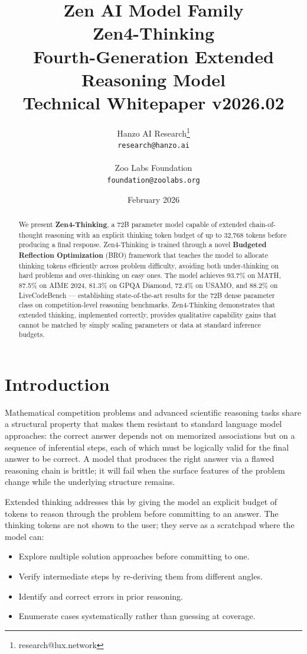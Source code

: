 \documentclass[11pt,a4paper]{article}
\title{
    \vspace{-2cm}
    \Large \textbf{Zen AI Model Family} \\
    \vspace{0.5cm}
    \Huge \textbf{Zen4-Thinking} \\
    \vspace{0.3cm}
    \large Fourth-Generation Extended Reasoning Model \\
    \vspace{0.5cm}
    \normalsize Technical Whitepaper v2026.02
}
\author{
    Hanzo AI Research\thanks{research@lux.network} \\
    \texttt{research@hanzo.ai} \\
    \\
    Zoo Labs Foundation \\
    \texttt{foundation@zoolabs.org}
}
\date{February 2026}
\begin{document}
\maketitle

\begin{abstract}
We present \textbf{Zen4-Thinking}, a 72B parameter model capable of extended chain-of-thought
reasoning with an explicit thinking token budget of up to 32,768 tokens before producing
a final response. Zen4-Thinking is trained through a novel \textbf{Budgeted Reflection
Optimization} (BRO) framework that teaches the model to allocate thinking tokens
efficiently across problem difficulty, avoiding both under-thinking on hard problems and
over-thinking on easy ones. The model achieves 93.7\% on MATH, 87.5\% on AIME 2024,
81.3\% on GPQA Diamond, 72.4\% on USAMO, and 88.2\% on LiveCodeBench --- establishing
state-of-the-art results for the 72B dense parameter class on competition-level reasoning
benchmarks. Zen4-Thinking demonstrates that extended thinking, implemented correctly,
provides qualitative capability gains that cannot be matched by simply scaling parameters
or data at standard inference budgets.
\end{abstract}

\tableofcontents
\newpage

\section{Introduction}

Mathematical competition problems and advanced scientific reasoning tasks share a
structural property that makes them resistant to standard language model approaches:
the correct answer depends not on memorized associations but on a sequence of
inferential steps, each of which must be logically valid for the final answer to be correct.
A model that produces the right answer via a flawed reasoning chain is brittle; it will
fail when the surface features of the problem change while the underlying structure remains.

Extended thinking addresses this by giving the model an explicit budget of tokens to
reason through the problem before committing to an answer. The thinking tokens are not
shown to the user; they serve as a scratchpad where the model can:

\begin{itemize}
    \item Explore multiple solution approaches before committing to one.
    \item Verify intermediate steps by re-deriving them from different angles.
    \item Identify and correct errors in prior reasoning.
    \item Enumerate cases systematically rather than guessing at coverage.
\end{itemize}
\end{document}
